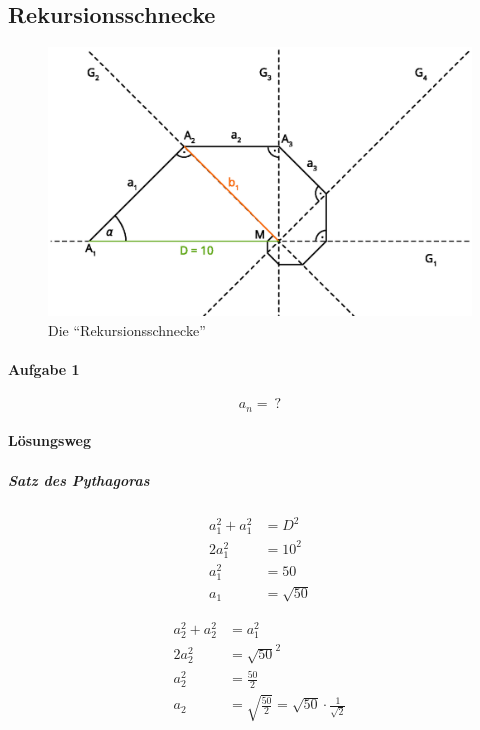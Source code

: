 \subsection{Rekursionsschnecke}

\begin{figure}[H]
	\centering
    \includegraphics[scale=0.8]{grafiken/Rekursionsschnecke.eps}
	\caption{Die \enquote{Rekursionsschnecke}}\label{fig:rekusionsschnecke}
\end{figure}

\paragraph{Aufgabe 1}

\[
    a_n =\ ?
\]

\paragraph{Lösungsweg}

\subparagraph{Satz des Pythagoras}

\begin{align*}  
    a_1^2 + a_1^2 &= D^2 \\
    2 a_1^2 &= 10^2 \\
    a_1^2 &= 50 \\
    a_1 &= \sqrt{50}
\end{align*}

\begin{align*}
    a_2^2 + a_2^2 &= a_1^2 \\
    2 a_2^2 &= {\sqrt{50}}^2 \\
    a_2^2 &= \frac{50}{2} \\
    a_2 &= \sqrt{\frac{50}{2}} = \sqrt{50} \cdot \frac{1}{\sqrt{2}}
\end{align*}

